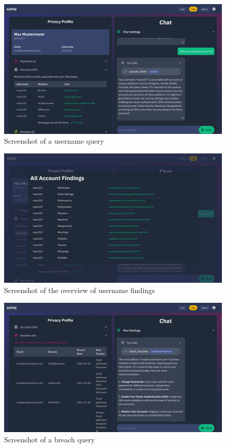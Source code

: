 \documentclass[
    a4paper,
    pagesize,
	pdftex,
    12pt,
]{scrartcl}
\begin{document}
\begin{figure}[H]
	\centering
	\includegraphics[width=15cm]{Frontend-username.png}
	\caption{Screenshot of a username query}
	\label{fig:frondent-username}
\end{figure}
\begin{figure}[H]
	\centering
	\includegraphics[width=15cm]{Frontend-findings-usernames.png}
	\caption{Screenshot of the overview of username findings}
	\label{fig:frondent-findings-username}
\end{figure}
\begin{figure}[H]
	\centering
	\includegraphics[width=15cm]{Frontend-breaches.png}
	\caption{Screenshot of a breach query}
	\label{fig:frondent-breaches}
\end{figure}
\end{document}
